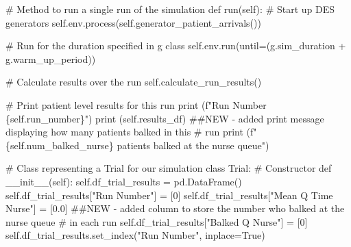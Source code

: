 \documentclass[
  letterpaper,
  DIV=11,
  numbers=noendperiod]{scrreprt}
\newenvironment{Shaded}{\begin{snugshade}}{\end{snugshade}}
\newcommand{\BuiltInTok}[1]{\textcolor[rgb]{0.00,0.23,0.31}{#1}}
\newcommand{\CommentTok}[1]{\textcolor[rgb]{0.37,0.37,0.37}{#1}}
\newcommand{\DecValTok}[1]{\textcolor[rgb]{0.68,0.00,0.00}{#1}}
\newcommand{\FloatTok}[1]{\textcolor[rgb]{0.68,0.00,0.00}{#1}}
\newcommand{\FunctionTok}[1]{\textcolor[rgb]{0.28,0.35,0.67}{#1}}
\newcommand{\KeywordTok}[1]{\textcolor[rgb]{0.00,0.23,0.31}{#1}}
\newcommand{\NormalTok}[1]{\textcolor[rgb]{0.00,0.23,0.31}{#1}}
\newcommand{\OperatorTok}[1]{\textcolor[rgb]{0.37,0.37,0.37}{#1}}
\newcommand{\SpecialCharTok}[1]{\textcolor[rgb]{0.37,0.37,0.37}{#1}}
\newcommand{\SpecialStringTok}[1]{\textcolor[rgb]{0.13,0.47,0.30}{#1}}
\newcommand{\StringTok}[1]{\textcolor[rgb]{0.13,0.47,0.30}{#1}}
\newcommand{\VariableTok}[1]{\textcolor[rgb]{0.07,0.07,0.07}{#1}}
\begin{document}
\begin{tcolorbox}
\begin{Shaded}
\begin{Highlighting}[]
    \CommentTok{\# Method to run a single run of the simulation}
    \KeywordTok{def}\NormalTok{ run(}\VariableTok{self}\NormalTok{):}
        \CommentTok{\# Start up DES generators}
        \VariableTok{self}\NormalTok{.env.process(}\VariableTok{self}\NormalTok{.generator\_patient\_arrivals())}

        \CommentTok{\# Run for the duration specified in g class}
        \VariableTok{self}\NormalTok{.env.run(until}\OperatorTok{=}\NormalTok{(g.sim\_duration }\OperatorTok{+}\NormalTok{ g.warm\_up\_period))}

        \CommentTok{\# Calculate results over the run}
        \VariableTok{self}\NormalTok{.calculate\_run\_results()}

        \CommentTok{\# Print patient level results for this run}
        \BuiltInTok{print}\NormalTok{ (}\SpecialStringTok{f"Run Number }\SpecialCharTok{\{}\VariableTok{self}\SpecialCharTok{.}\NormalTok{run\_number}\SpecialCharTok{\}}\SpecialStringTok{"}\NormalTok{)}
        \BuiltInTok{print}\NormalTok{ (}\VariableTok{self}\NormalTok{.results\_df)}
        \CommentTok{\#\#NEW {-} added print message displaying how many patients balked in this}
        \CommentTok{\# run}
        \BuiltInTok{print}\NormalTok{ (}\SpecialStringTok{f"}\SpecialCharTok{\{}\VariableTok{self}\SpecialCharTok{.}\NormalTok{num\_balked\_nurse}\SpecialCharTok{\}}\SpecialStringTok{ patients balked at the nurse queue"}\NormalTok{)}

\CommentTok{\# Class representing a Trial for our simulation}
\KeywordTok{class}\NormalTok{ Trial:}
    \CommentTok{\# Constructor}
    \KeywordTok{def}  \FunctionTok{\_\_init\_\_}\NormalTok{(}\VariableTok{self}\NormalTok{):}
        \VariableTok{self}\NormalTok{.df\_trial\_results }\OperatorTok{=}\NormalTok{ pd.DataFrame()}
        \VariableTok{self}\NormalTok{.df\_trial\_results[}\StringTok{"Run Number"}\NormalTok{] }\OperatorTok{=}\NormalTok{ [}\DecValTok{0}\NormalTok{]}
        \VariableTok{self}\NormalTok{.df\_trial\_results[}\StringTok{"Mean Q Time Nurse"}\NormalTok{] }\OperatorTok{=}\NormalTok{ [}\FloatTok{0.0}\NormalTok{]}
        \CommentTok{\#\#NEW {-} added column to store the number who balked at the nurse queue}
        \CommentTok{\# in each run}
        \VariableTok{self}\NormalTok{.df\_trial\_results[}\StringTok{"Balked Q Nurse"}\NormalTok{] }\OperatorTok{=}\NormalTok{ [}\DecValTok{0}\NormalTok{]}
        \VariableTok{self}\NormalTok{.df\_trial\_results.set\_index(}\StringTok{"Run Number"}\NormalTok{, inplace}\OperatorTok{=}\VariableTok{True}\NormalTok{)}


\end{Highlighting}
\end{Shaded}
\end{tcolorbox}
\end{document}
